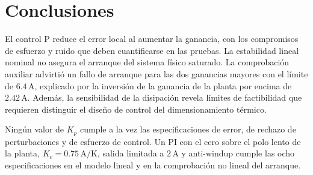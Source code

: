 \section{Conclusiones}\label{sec:conclusiones}
El control P reduce el error local al aumentar la ganancia, con los compromisos de esfuerzo y ruido que deben cuantificarse en las pruebas. La estabilidad lineal nominal no asegura el arranque del sistema físico saturado. La comprobación auxiliar advirtió un fallo de arranque para las dos ganancias mayores con el límite de $6.4\,\mathrm A$, explicado por la inversión de la ganancia de la planta por encima de $2.42\,\mathrm A$. Además, la sensibilidad de la disipación revela límites de factibilidad que requieren distinguir el diseño de control del dimensionamiento térmico.

Ningún valor de $K_p$ cumple a la vez las especificaciones de error, de rechazo de perturbaciones y de esfuerzo de control. Un PI con el cero sobre el polo lento de la planta, $K_c=0.75\,\mathrm{A/K}$, salida limitada a $2\,\mathrm A$ y anti-windup cumple las ocho especificaciones en el modelo lineal y en la comprobación no lineal del arranque. 
